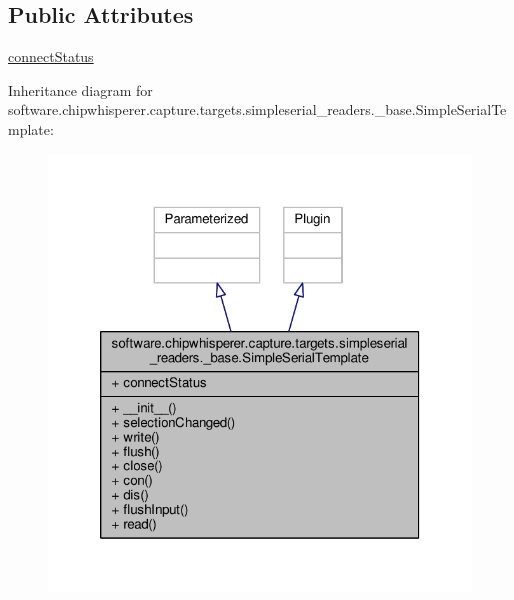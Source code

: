 \subsection*{Public Attributes}
\begin{DoxyCompactItemize}
\item 
\hyperlink{classsoftware_1_1chipwhisperer_1_1capture_1_1targets_1_1simpleserial__readers_1_1__base_1_1SimpleSerialTemplate_ad3d47613cabb8286d1c435703050daa8}{connect\+Status}
\end{DoxyCompactItemize}


Inheritance diagram for software.\+chipwhisperer.\+capture.\+targets.\+simpleserial\+\_\+readers.\+\_\+base.\+Simple\+Serial\+Template\+:\nopagebreak
\begin{figure}[H]
\begin{center}
\leavevmode
\includegraphics[width=320pt]{de/dbb/classsoftware_1_1chipwhisperer_1_1capture_1_1targets_1_1simpleserial__readers_1_1__base_1_1SimpleSerialTemplate__inherit__graph}
\end{center}
\end{figure}


